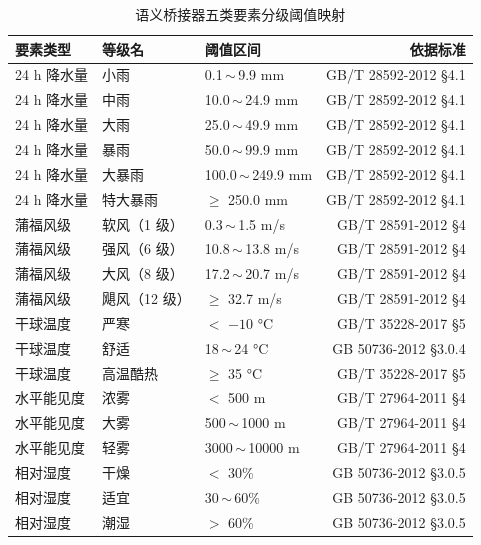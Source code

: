 \documentclass[a4paper]{article}
\newcommand{\song}{\CJKfamily{song}}
\theoremstyle{definition}
\theoremstyle{plain}
\theoremstyle{remark}
\begin{document}
\begin{table}[!ht]
    \centering
    \caption{语义桥接器五类要素分级阈值映射}
    \label{tab:semantic-mapping}
    \song\fontsize{9pt}{12pt}\selectfont
    \renewcommand{\arraystretch}{0.95}
    \begin{tabular}{lllr}
        \toprule
        要素类型 & 等级名 & 阈值区间 & 依据标准 \\
        \midrule
        24 h 降水量 & 小雨 & 0.1\,$\sim$\,9.9 mm & GB/T 28592-2012 §4.1 \\
        24 h 降水量 & 中雨 & 10.0\,$\sim$\,24.9 mm & GB/T 28592-2012 §4.1 \\
        24 h 降水量 & 大雨 & 25.0\,$\sim$\,49.9 mm & GB/T 28592-2012 §4.1 \\
        24 h 降水量 & 暴雨 & 50.0\,$\sim$\,99.9 mm & GB/T 28592-2012 §4.1 \\
        24 h 降水量 & 大暴雨 & 100.0\,$\sim$\,249.9 mm & GB/T 28592-2012 §4.1 \\
        24 h 降水量 & 特大暴雨 & $\geq$ 250.0 mm & GB/T 28592-2012 §4.1 \\
        \midrule
        蒲福风级 & 软风（1 级） & 0.3\,$\sim$\,1.5 m/s & GB/T 28591-2012 §4 \\
        蒲福风级 & 强风（6 级） & 10.8\,$\sim$\,13.8 m/s & GB/T 28591-2012 §4 \\
        蒲福风级 & 大风（8 级） & 17.2\,$\sim$\,20.7 m/s & GB/T 28591-2012 §4 \\
        蒲福风级 & 飓风（12 级） & $\geq$ 32.7 m/s & GB/T 28591-2012 §4 \\
        \midrule
        干球温度 & 严寒 & $<$ $-10$ °C & GB/T 35228-2017 §5 \\
        干球温度 & 舒适 & 18\,$\sim$\,24 °C & GB 50736-2012 §3.0.4 \\
        干球温度 & 高温酷热 & $\geq$ 35 °C & GB/T 35228-2017 §5 \\
        \midrule
        水平能见度 & 浓雾 & $<$ 500 m & GB/T 27964-2011 §4 \\
        水平能见度 & 大雾 & 500\,$\sim$\,1000 m & GB/T 27964-2011 §4 \\
        水平能见度 & 轻雾 & 3000\,$\sim$\,10000 m & GB/T 27964-2011 §4 \\
        \midrule
        相对湿度 & 干燥 & $<$ 30\% & GB 50736-2012 §3.0.5 \\
        相对湿度 & 适宜 & 30\,$\sim$\,60\% & GB 50736-2012 §3.0.5 \\
        相对湿度 & 潮湿 & $>$ 60\% & GB 50736-2012 §3.0.5 \\
        \bottomrule
    \end{tabular}
\end{table}
\end{document}
